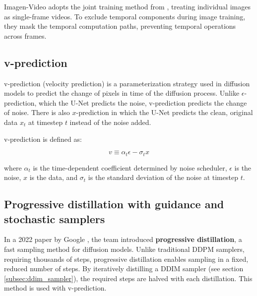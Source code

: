 Imagen-Video adopts the joint training method from \cite{video_diffusion_models}, treating individual images as single-frame videos. To exclude temporal components during image training, they mask the temporal computation paths, preventing temporal operations across frames.




















\subsection{v-prediction}

v-prediction (velocity prediction) is a parameterization strategy used in diffusion models to predict the change of pixels in time of the diffusion process. Unlike $\epsilon$-prediction, which the U-Net predicts the noise, v-prediction predicts the change of noise. There is also $x$-prediction in which the U-Net predicts the clean, original data $x_t$ at timestep $t$ instead of the noise added.

v-prediction is defined as:

\[ v \equiv \alpha_t \epsilon - \sigma_t x \]

where $\alpha_t$ is the time-dependent coefficient determined by noise scheduler, $\epsilon$ is the noise, $x$ is the data, and $\sigma_t$ is the standard deviation of the noise at timestep $t$.
















\subsection{Progressive distillation with guidance and stochastic samplers}

In a 2022 paper by Google \cite{v_prediction}, the team introduced \textbf{progressive distillation}, a fast sampling method for diffusion models. Unlike traditional DDPM samplers, requiring thousands of steps, progressive distillation enables sampling in a fixed, reduced number of steps. By iteratively distilling a DDIM sampler (see section \ref{subsec:ddim_sampler}), the required steps are halved with each distillation. This method is used with v-prediction.

